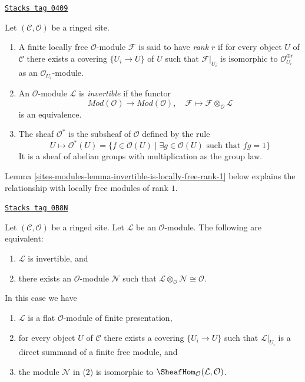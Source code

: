 \begin{definition}
\label{sites-modules-definition-invertible-sheaf}
\href{https://stacks.math.columbia.edu/tag/0409}{\texttt{Stacks tag 0409}}

Let $(\mathcal{C}, \mathcal{O})$ be a ringed site.
\begin{enumerate}
\item A finite locally free $\mathcal{O}$-module $\mathcal{F}$ is said
to have {\it rank $r$} if for every object $U$ of $\mathcal{C}$ there
exists a covering $\{U_i \to U\}$ of $U$ such that $\mathcal{F}|_{U_i}$
is isomorphic to $\mathcal{O}_{U_i}^{\oplus r}$ as an
$\mathcal{O}_{U_i}$-module.
\item An $\mathcal{O}$-module $\mathcal{L}$ is {\it invertible}
if the functor
$$
\textit{Mod}(\mathcal{O}) \longrightarrow \textit{Mod}(\mathcal{O}),\quad
\mathcal{F}  \longmapsto \mathcal{F} \otimes_\mathcal{O} \mathcal{L}
$$
is an equivalence.
\item The sheaf {\it $\mathcal{O}^*$} is the subsheaf of
$\mathcal{O}$ defined by the rule
$$
U \longmapsto \mathcal{O}^*(U) = \{f \in \mathcal{O}(U) \mid
\exists g \in \mathcal{O}(U)\text{ such that }fg = 1\}
$$
It is a sheaf of abelian groups with multiplication as the group law.
\end{enumerate}
\end{definition}

Lemma \ref{sites-modules-lemma-invertible-is-locally-free-rank-1}
below explains the relationship with locally free modules
of rank $1$.

\begin{lemma}[Invertible]
\label{sites-modules-lemma-invertible}
\href{https://stacks.math.columbia.edu/tag/0B8N}{\texttt{Stacks tag 0B8N}}

Let $(\mathcal{C}, \mathcal{O})$ be a ringed site. Let $\mathcal{L}$
be an $\mathcal{O}$-module. The following are equivalent:
\begin{enumerate}
\item $\mathcal{L}$ is invertible, and
\item there exists an $\mathcal{O}$-module $\mathcal{N}$
such that
$\mathcal{L} \otimes_\mathcal{O} \mathcal{N} \cong \mathcal{O}$.
\end{enumerate}
In this case we have
\begin{enumerate}
\item[(a)] $\mathcal{L}$ is a flat $\mathcal{O}$-module of finite presentation,
\item[(b)] for every object $U$ of $\mathcal{C}$ there exists a
covering $\{U_i \to U\}$ such that $\mathcal{L}|_{U_i}$
is a direct summand of a finite free module, and
\item[(c)] the module $\mathcal{N}$ in (2) is isomorphic to
$\SheafHom_\mathcal{O}(\mathcal{L}, \mathcal{O})$.
\end{enumerate}
\end{lemma}

